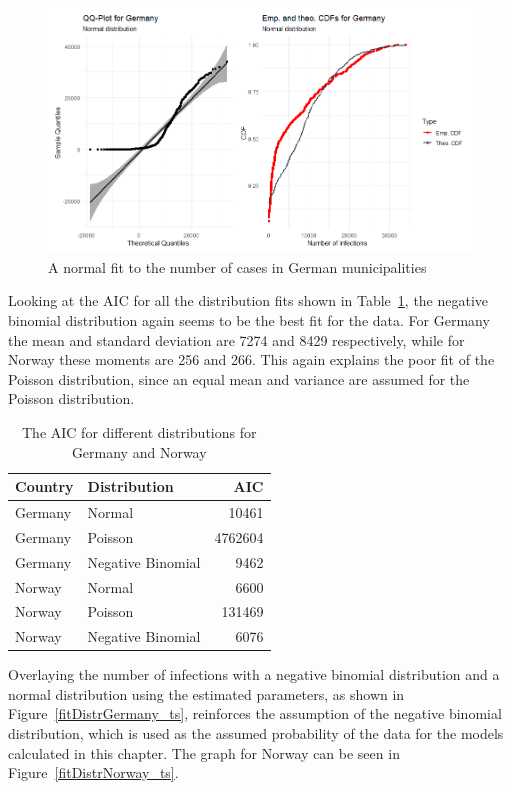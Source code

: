 \begin{figure}[H]
  \centering
  \includegraphics[width = \textwidth]{fit_normal_germany_ts.png}
  \caption{A normal fit to the number of cases in German municipalities}
  \label{fitNormalGermany_ts}
\end{figure}
Looking at the AIC for all the distribution fits shown in Table~\ref{aic_temporal}, the negative binomial distribution again seems to be the best fit for the data. For Germany the mean and standard deviation are 7274 and 8429 respectively, while for Norway these moments are 256 and 266. This again explains the poor fit of the Poisson distribution, since an equal mean and variance are assumed for the Poisson distribution.
\begin{table}[H] 
\caption{The AIC for different distributions for Germany and Norway \label{aic_temporal}}
\begin{tabular}{l l r}
\toprule
\textbf{Country}	& \textbf{Distribution}	& \textbf{AIC} \\
\midrule
Germany & Normal & 10461 \\
Germany & Poisson & 4762604 \\
Germany & Negative Binomial & 9462 \\
Norway & Normal & 6600 \\
Norway & Poisson & 131469 \\
Norway & Negative Binomial & 6076 \\
\bottomrule
\end{tabular}
\end{table}
Overlaying the number of infections with a negative binomial distribution and a normal distribution using the estimated parameters, as shown in Figure~\ref{fitDistrGermany_ts}, reinforces the assumption of the negative binomial distribution, which is used as the assumed probability of the data for the models calculated in this chapter. The graph for Norway can be seen in Figure~\ref{fitDistrNorway_ts}.
